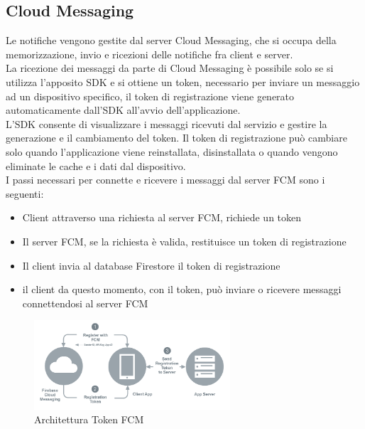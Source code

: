 \subsection{Cloud Messaging}
Le notifiche vengono gestite dal server Cloud Messaging, che si occupa della memorizzazione, invio e ricezioni delle notifiche fra client e server.\\
La ricezione dei messaggi da parte di Cloud Messaging è possibile solo se si utilizza l'apposito SDK e si ottiene un token, necessario per inviare un messaggio ad un dispositivo specifico, il token di registrazione viene generato automaticamente dall'SDK all'avvio dell'applicazione.\\
L'SDK consente di visualizzare i messaggi ricevuti dal servizio e gestire la generazione e il cambiamento del token. Il token di registrazione può cambiare solo quando l'applicazione viene reinstallata, disinstallata o quando vengono eliminate le cache e i dati dal dispositivo.\\
I passi necessari per connette e ricevere i messaggi dal server FCM sono i seguenti:
\begin{itemize}
    \item Client attraverso una richiesta al server FCM, richiede un token
    \item Il server FCM, se la richiesta è valida, restituisce un token di registrazione
    \item Il client invia al database Firestore il token di registrazione
    \item il client da questo momento, con il token, può inviare o ricevere messaggi connettendosi al server FCM
\end{itemize}

\begin{figure}[!hb]
  \centering
  \includegraphics[width=0.65\textwidth]{immagini/fcm_token.png}
  \caption{Architettura Token FCM} \label{fig:Architettura Token FCM}
\end{figure}

